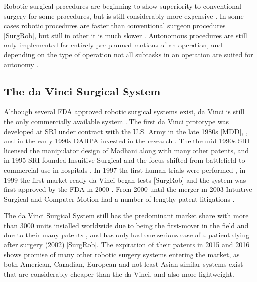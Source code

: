 Robotic surgical procedures are beginning to show superiority to conventional surgery for some procedures, but is still considerably more expensive \citep{bib:docatadist}. In some cases robotic procedures are faster than conventional surgeon procedures [SurgRob], but still in other it is much slower \citep{bib:raven_ii,bib:raven_debride}.
Autonomous procedures are still only implemented for entirely pre-planned motions of an operation, and depending on the type of operation not all subtasks in an operation are suited for autonomy \citep{bib:raven_debride,bib:raven_ii}.





\subsection{The da Vinci Surgical System}
Although several FDA approved robotic surgical systems exist, da Vinci is still the only commercially available system \citep{bib:docatadist,bib:intuitive_monopoly}. The first da Vinci prototype was developed at SRI under contract with the U.S. Army in the late 1980s [MDD], \citep{bib:brown_univ}, and in the early 1990s DARPA invested in the research \citep[p 74]{bib:surgical_book}. The the mid 1990s SRI licensed the manipulator design of Madhani along with many other patents, and in 1995 SRI founded Insuitive Surgical and the focus shifted from battlefield to commercial use in hospitals \citep{bib:intuitive_monopoly}.
In 1997 the first human trials were performed \citep{bib:intuitive_monopoly}, in 1999 the first market-ready da Vinci began tests [SurgRob] and the system was first approved by the FDA in 2000 \citep{bib:intuitive_monopoly,bib:brown_univ}. From 2000 until the merger in 2003 Intuitive Surgical and Computer Motion had a number of lengthy patent litigations \citep{bib:intuitive_monopoly,bib:telesurg_history}.

The da Vinci Surgical System still has the predominant market share with more than 3000 units installed worldwide due to being the first-mover in the field and due to their many patents \citep{bib:intuitive_monopoly}, and has only had one serious case of a patient dying after surgery (2002) [SurgRob].
The expiration of their patents in 2015 and 2016 \citep{bib:intuitive_monopoly} shows promise of many other robotic surgery systems entering the market, as both American, Canadian, European and not least Asian similar systems exist that are considerably cheaper than the da Vinci, and also more lightweight.

